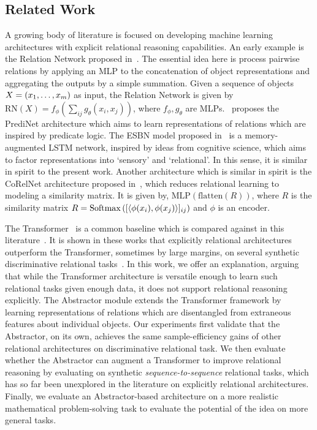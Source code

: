 \subsection{Related Work}\label{ssec:related_work}
A growing body of literature is focused on developing machine learning architectures with explicit relational reasoning capabilities. An early example is the Relation Network proposed in~\citep{santoro1}. The essential idea here is process pairwise relations by applying an MLP to the concatenation of object representations and aggregating the outputs by a simple summation. Given a sequence of objects $X = (x_1, \ldots, x_m)$ as input, the Relation Network is given by $\mathrm{RN}(X) = f_\phi(\sum_{ij} g_\theta(x_i, x_j))$, where $f_\phi, g_\theta$ are MLPs.~\citep{shanahanExplicitlyRelationalNeural} proposes the PrediNet architecture which aims to learn representations of relations which are inspired by predicate logic. The ESBN model proposed in~\citep{esbn} is a memory-augmented LSTM network, inspired by ideas from cognitive science, which aims to factor representations into `sensory' and `relational'. In this sense, it is similar in spirit to the present work. Another architecture which is similar in spirit is the CoRelNet architecture proposed in~\citep{kerg2022neural}, which reduces relational learning to modeling a similarity matrix. It is given by, $\mathrm{MLP}(\mathrm{flatten}(R))$, where $R$ is the similarity matrix $R = \mathrm{Softmax}\left([\left \langle \phi(x_i), \phi(x_j) \right\rangle]_{ij}\right)$ and $\phi$ is an encoder.

The Transformer~\citep{vaswani2017attention} is a common baseline which is compared against in this literature~. It is shown in these works that explicitly relational architectures outperform the Transformer, sometimes by large margins, on several synthetic discriminative relational tasks~\citep{shanahanExplicitlyRelationalNeural,esbn,kerg2022neural}. In this work, we offer an explanation, arguing that while the Transformer architecture is versatile enough to learn such relational tasks given enough data, it does not support relational reasoning explicitly. The Abstractor module extends the Transformer framework by learning representations of relations which are disentangled from extraneous features about individual objects. Our experiments first validate that the Abstractor, on its own, achieves the same sample-efficiency gains of other relational architectures on discriminative relational task. We then evaluate whether the Abstractor can augment a Transformer to improve relational reasoning by evaluating on synthetic \textit{sequence-to-sequence} relational tasks, which has so far been unexplored in the literature on explicitly relational architectures. Finally, we evaluate an Abstractor-based architecture on a more realistic mathematical problem-solving task to evaluate the potential of the idea on more general tasks.